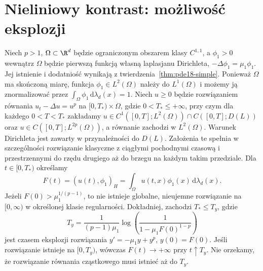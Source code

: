 \section{Nieliniowy kontrast: możliwość eksplozji}
\begin{twierdzenie}
\label{thm:pde20-blowup}
Niech $p>1$, $\Omega\subset\R^d$ będzie ograniczonym
obszarem klasy $C^{1,1}$, a $\phi_1>0$ wewnątrz $\Omega$
będzie pierwszą funkcją własną laplasjanu Dirichleta,
$-\Delta\phi_1=\mu_1\phi_1$. Jej istnienie i dodatniość
wynikają z twierdzenia~\ref{thm:pde18-simple}.
Ponieważ $\Omega$ ma skończoną miarę, funkcja
$\phi_1\in L^2(\Omega)$ należy do $L^1(\Omega)$
i możemy ją znormalizować przez
$\int_\Omega\phi_1\,\mathrm d\lambda_d(x)=1$.
Niech $u\ge0$ będzie rozwiązaniem równania
$u_t-\Delta u=u^p$ na $[0,T_*)\times\Omega$,
gdzie $0<T_*\le+\infty$, przy czym dla każdego $0<T<T_*$ zakładamy
$u\in C^1([0,T];L^2(\Omega))\cap C([0,T];D(L))$
oraz $u\in C([0,T];L^{2p}(\Omega))$, a równanie
zachodzi w $L^2(\Omega)$. Warunek Dirichleta jest
zawarty w przynależności do $D(L)$. Założenia te
spełnia w szczególności rozwiązanie klasyczne z
ciągłymi pochodnymi czasową i przestrzennymi do
rzędu drugiego aż do brzegu na każdym takim przedziale.
Dla $t\in[0,T_*)$ określamy
\[
 F(t)=(u(t),\phi_1)_H
     =\int_\Omega u(t,x)\phi_1(x)\,\mathrm d\lambda_d(x).
\]
Jeżeli $F(0)>\mu_1^{1/(p-1)}$, to nie istnieje globalne, nieujemne
rozwiązanie na $[0,\infty)$ w określonej klasie regularności.
Dokładniej, zachodzi $T_*\le T_y$, gdzie
\[
 T_y=\frac{1}{(p-1)\mu_1}
 \log\left(\frac{1}{1-\mu_1 F(0)^{1-p}}\right)
\]
jest czasem eksplozji rozwiązania
$y'=-\mu_1y+y^p$, $y(0)=F(0)$.
Jeśli rozwiązanie istnieje na $[0,T_y)$, wówczas
$F(t)\to+\infty$ przy $t\uparrow T_y$. Nie orzekamy,
że rozwiązanie równania cząstkowego musi istnieć aż
do $T_y$.
\end{twierdzenie}
